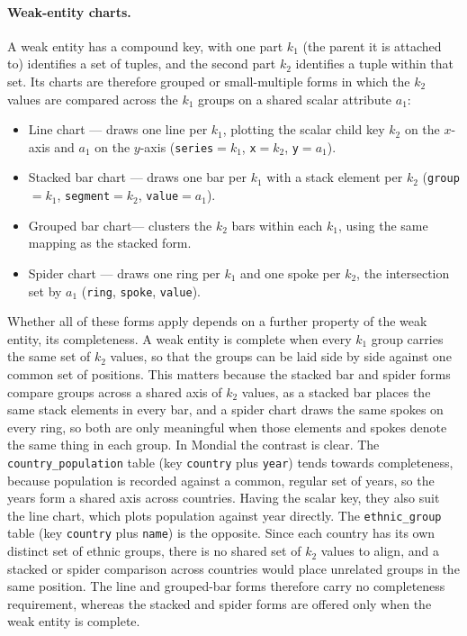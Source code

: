 \paragraph{Weak-entity charts.} A weak entity has a compound key, with one part $k_1$ (the parent it is attached to) identifies a set of tuples, and the second part $k_2$ identifies a tuple within that set. Its charts are therefore grouped or small-multiple forms in which the $k_2$ values are compared across the $k_1$ groups on a shared scalar attribute $a_1$:
\begin{itemize}
  \item Line chart --- draws one line per $k_1$, plotting the scalar child key $k_2$ on the $x$-axis and $a_1$ on the $y$-axis (\texttt{series}$=k_1$, \texttt{x}$=k_2$, \texttt{y}$=a_1$).
  \item Stacked bar chart --- draws one bar per $k_1$ with a stack element per $k_2$ (\texttt{group}$=k_1$, \texttt{segment}$=k_2$, \texttt{value}$=a_1$).
  \item Grouped bar chart--- clusters the $k_2$ bars within each $k_1$, using the same mapping as the stacked form.
  \item Spider chart --- draws one ring per $k_1$ and one spoke per $k_2$, the intersection set by $a_1$ (\texttt{ring}, \texttt{spoke}, \texttt{value}).
\end{itemize}
Whether all of these forms apply depends on a further property of the weak entity, its completeness. A weak entity is complete when every $k_1$ group carries the same set of $k_2$ values, so that the groups can be laid side by side against one common set of positions. This matters because the stacked bar and spider forms compare groups across a shared axis of $k_2$ values, as a stacked bar places the same stack elements in every bar, and a spider chart draws the same spokes on every ring, so both are only meaningful when those elements and spokes denote the same thing in each group. In Mondial the contrast is clear. The \texttt{country\_population} table (key \texttt{country} plus \texttt{year}) tends towards completeness, because population is recorded against a common, regular set of years, so the years form a shared axis across countries. Having the scalar key, they also suit the line chart, which plots population against year directly. The \texttt{ethnic\_group} table (key \texttt{country} plus \texttt{name}) is the opposite. Since each country has its own distinct set of ethnic groups, there is no shared set of $k_2$ values to align, and a stacked or spider comparison across countries would place unrelated groups in the same position. The line and grouped-bar forms therefore carry no completeness requirement, whereas the stacked and spider forms are offered only when the weak entity is complete.

